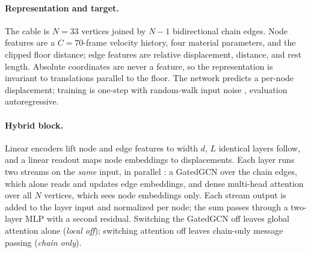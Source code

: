 \documentclass[mlabstract,onecolumn]{jmlr}
\begin{document}
\paragraph{Representation and target.}
The cable is $N{=}33$ vertices joined by $N{-}1$ bidirectional chain edges.
Node features are a $C{=}70$-frame velocity history, four material parameters,
and the clipped floor distance; edge features are relative displacement,
distance, and rest length. Absolute coordinates are never a feature, so the
representation is invariant to translations parallel to the floor. The network
predicts a per-node displacement; training is one-step with random-walk input
noise \citep{sanchezgonzalez2020gns}, evaluation autoregressive.

\paragraph{Hybrid block.}
Linear encoders lift node and edge features to width $d$, $L$ identical layers
follow, and a linear readout maps node embeddings to displacements. Each layer
runs two streams on the \emph{same} input, in parallel
\citep{rampasek2022graphgps}: a GatedGCN over the chain edges, which alone
reads and updates edge embeddings, and dense multi-head attention over all $N$
vertices, which sees node embeddings only. Each stream output is added to the
layer input and normalized per node; the sum passes through a two-layer MLP
with a second residual. Switching the GatedGCN off leaves global attention
alone (\emph{local off}); switching attention off leaves chain-only message
passing (\emph{chain only}).
\end{document}
